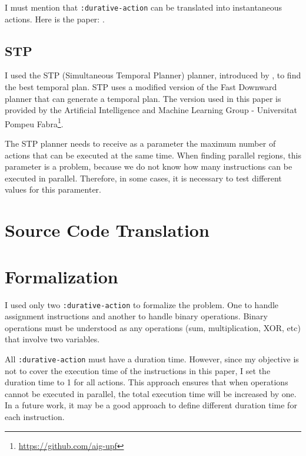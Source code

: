 \documentclass[letterpaper]{article}
\begin{document}
I must mention that \texttt{:durative-action} can be translated into instantaneous actions. Here is the paper: \cite{DBLP:conf/ecai/ScalaHTR16}.


\subsection{STP}

I used the STP (Simultaneous Temporal Planner) planner, introduced by \cite{Blanco2018ForwardsearchTP}, to find the best temporal plan. STP uses a modified version of the Fast Downward \cite{Helmert_2006} planner that can generate a temporal plan. The version used in this paper is provided by the Artificial Intelligence and Machine Learning Group - Universitat Pompeu Fabra\footnote{\href{https://github.com/aig-upf}{https://github.com/aig-upf}}.

The STP planner needs to receive as a parameter the maximum number of actions that can be executed at the same time. When finding parallel regions, this parameter is a problem, because we do not know how many instructions can be executed in parallel. Therefore, in some cases, it is necessary to test different values for this paramenter.


\section{Source Code Translation}



\section{Formalization}

I used only two \texttt{:durative-action} to formalize the problem. One to handle assignment instructions and another to handle binary operations. Binary operations must be understood as any operations (sum, multiplication, XOR, etc) that involve two variables.

All \texttt{:durative-action} must have a duration time. However, since my objective is not to cover the execution time of the instructions in this paper, I set the duration time to 1 for all actions. This approach ensures that when operations cannot be executed in parallel, the total execution time will be increased by one. In a future work, it may be a good approach to define different duration time for each instruction.
\end{document}
